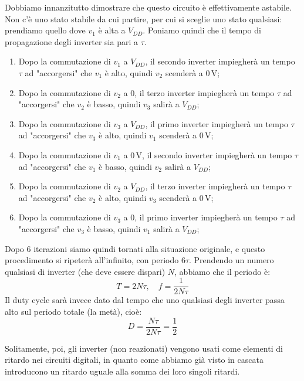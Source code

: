 \documentclass[a4paper,11pt]{article}
\begin{document}
Dobbiamo innanzitutto dimostrare che questo circuito è effettivamente astabile. Non c'è uno stato stabile da cui partire, per cui si sceglie uno stato qualsiasi: prendiamo quello dove $v_1$ è alta a $V_{DD}$. Poniamo quindi che il tempo di propagazione degli inverter sia pari a $\tau$. 

\begin{enumerate}
	\item Dopo la commutazione di $v_1$ a $V_{DD}$, il secondo inverter impiegherà un tempo $\tau$ ad "accorgersi" che $v_1$ è alto, quindi $v_2$ scenderà a $0 \, \mathrm{V}$;
	\item Dopo la commutazione di $v_2$ a $0$, il terzo inverter impiegherà un tempo $\tau$ ad "accorgersi" che $v_2$ è basso, quindi $v_3$ salirà a $V_{DD}$;
	\item Dopo la commutazione di $v_3$ a $V_{DD}$, il primo inverter impiegherà un tempo $\tau$ ad "accorgersi" che $v_3$ è alto, quindi $v_1$ scenderà a $0 \, \mathrm{V}$;
	\item Dopo la commutazione di $v_1$ a $0 \, \mathrm{V}$, il secondo inverter impiegherà un tempo $\tau$ ad "accorgersi" che $v_1$ è basso, quindi $v_2$ salirà a $V_{DD}$;
	\item Dopo la commutazione di $v_2$ a $V_{DD}$, il terzo inverter impiegherà un tempo $\tau$ ad "accorgersi" che $v_2$ è alto, quindi $v_3$ scenderà a $0 \, \mathrm{V}$;
	\item Dopo la commutazione di $v_3$ a $0$, il primo inverter impiegherà un tempo $\tau$ ad "accorgersi" che $v_3$ è basso, quindi $v_1$ salirà a $V_{DD}$;
\end{enumerate}

Dopo 6 iterazioni siamo quindi tornati alla situazione originale, e questo procedimento si ripeterà all'infinito, con periodo $6\tau$. Prendendo un numero qualsiasi di inverter (che deve essere dispari) $N$, abbiamo che il periodo è:
$$
T = 2 N \tau, \quad f = \frac{1}{2 N \tau}
$$
Il duty cycle sarà invece dato dal tempo che uno qualsiasi degli inverter passa alto sul periodo totale (la metà), cioè: 
$$
D = \frac{N \tau}{2 N \tau} = \frac{1}{2}
$$

Solitamente, poi, gli inverter (non reazionati) vengono usati come elementi di ritardo nei circuiti digitali, in quanto come abbiamo già visto in cascata introducono un ritardo uguale alla somma dei loro singoli ritardi.
\end{document}
